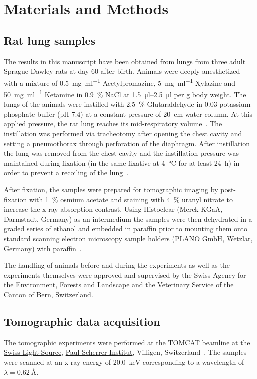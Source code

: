 \documentclass[paper=a4,abstract=true,english,DIV=calc]{scrartcl}
\begin{document}
\section{Materials and Methods\label{sec:materials and methods}}
\subsection{Rat lung samples}
The results in this manuscript have been obtained from lungs from three adult Sprague-Dawley rats at day 60 after birth.
Animals were deeply anesthetized with a mixture of %
\SI{0.5}{\milli\gram\per\milli\litre} Acetylpromazine, %
\SI{5}{\milli\gram\per\milli\litre} Xylazine and %
\SI{50}{\milli\gram\per\milli\litre} Ketamine in %
\SI{0.9}{\percent} NaCl at \SIrange{1.5}{2.5}{\micro\litre} per \si{\gram} body weight.
The lungs of the animals were instilled with \SI{2.5}{\percent} Glutaraldehyde in \SI{0.03}{\Molar} potassium-phosphate buffer (pH 7.4) at a constant pressure of \SI{20}{\centi\meter} water column.
At this applied pressure, the rat lung reaches its mid-respiratory volume~\cite{Schittny1998}.
The instillation was performed via tracheotomy after opening the chest cavity and setting a pneumothorax through perforation of the diaphragm.
After instillation the lung was removed from the chest cavity and the instillation pressure was maintained during fixation (in the same fixative at \SI{4}{\celsius} for at least \SI{24}{\hour}) in order to prevent a recoiling of the lung~\cite{Tschanz2002}.

After fixation, the samples were prepared for tomographic imaging by post-fixation with \SI{1}{\percent} osmium acetate and staining with \SI{4}{\percent} uranyl nitrate to increase the x-ray absorption contrast.
Using Histoclear (Merck KGaA, Darmstadt, Germany) as an intermedium the samples were then dehydrated in a graded series of ethanol and embedded in paraffin prior to mounting them onto standard scanning electron microscopy sample holders (PLANO GmbH, Wetzlar, Germany) with paraffin~\cite{Tsuda2008}.

The handling of animals before and during the experiments as well as the experiments themselves were approved and supervised by the Swiss Agency for the Environment, Forests and Landscape and the Veterinary Service of the Canton of Bern, Switzerland.

\subsection{Tomographic data acquisition}
The tomographic experiments were performed at the \href{http://www.psi.ch/sls/tomcat/}{TOMCAT beamline} at the \href{http://www.psi.ch/sls/}{Swiss Light Source}, \href{http://www.psi.ch/}{Paul Scherrer Institut}, Villigen, Switzerland~\cite{Stampanoni2006a}.
The samples were scanned at an x-ray energy of \SI{20.0}{\kilo\electronvolt} corresponding to a wavelength of \(\lambda=\SI{0.62}{\angstrom}\).%
\end{document}
